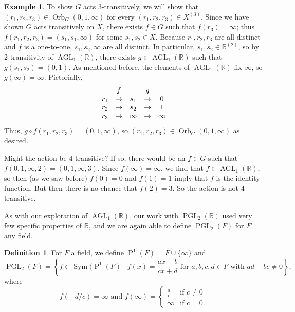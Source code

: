 \documentclass[11pt]{amsart}
\theoremstyle{plain}
\theoremstyle{definition}
\newtheorem*{definition*}{Definition}
\newtheorem{example}{Example}
\theoremstyle{remark}
\DeclareMathOperator{\Sym}{Sym}
\DeclareMathOperator{\AGL}{AGL}
\DeclareMathOperator{\PGL}{PGL}
\DeclareMathOperator{\Proj}{P}
\DeclareMathOperator{\Orb}{Orb}
\begin{document}
\begin{example}
To show $G$ acts $3$-transitively, we will show that $(r_1,r_2,r_3)\in \Orb_G(0,1,\infty)$ for every $(r_1,r_2,r_3)\in X^{(3)}$. Since we have shown $G$ acts transitively on $X$, there exists $f\in G$ such that $f(r_3) = \infty$; thus $f(r_1,r_2,r_3) = (s_1,s_1,\infty)$ for some $s_1,s_2\in X$.  Because $r_1,r_2,r_3$ are all distinct and $f$ is a one-to-one, $s_1,s_2,\infty$ are all distinct. In particular, $s_1,s_2 \in \mathbb{R}^{(2)}$, so by $2$-transitivity of $\AGL_1(\mathbb{R})$, there exists $g\in \AGL_1(\mathbb{R})$ such that $g(s_1,s_2) = (0,1)$. As mentioned before, the elements of $\AGL_1(\mathbb{R})$ fix $\infty$, so $g(\infty) = \infty$. Pictorially,
\[\begin{array}{ccccc}
\footnotesize
    & f           &        & g           & \\
r_1 & \rightarrow & s_1   & \rightarrow & 0\\
r_2 & \rightarrow & s_2   & \rightarrow & 1\\
r_3 & \rightarrow & \infty & \rightarrow & \infty\\
\end{array}\]
Thus, $g\circ f(r_1,r_2,r_3) = (0,1,\infty)$, so $(r_1,r_2,r_3)\in \Orb_G(0,1,\infty)$ as desired.

Might the action be $4$-transitive? If so, there would be an $f\in G$ such that $f (0,1,\infty,2) = (0,1,\infty,3)$. Since $f(\infty) = \infty$, we find that $f\in \AGL_1(\mathbb{R})$, so then (as we saw before) $f(0) = 0$ and $f(1) = 1$ imply that $f$ is the identity function. But then there is no chance that $f(2) = 3$. So the action is not $4$-transitive.
\end{example}

As with our exploration of $\AGL_1(\mathbb{R})$, our work with $\PGL_2(\mathbb{R})$ used very few specific properties of $\mathbb{R}$, and we are again able to define $\PGL_2(F)$ for $F$ any field.

\begin{definition*}
For $F$ a field, we define $\Proj^1(F) = F \cup \{\infty\}$ and \[\PGL_2(F) = \left\{ f \in \Sym(\Proj^1(F) \mid \text{$f(x) = \frac{ax+b}{cx+d}$ for $a,b,c,d\in F$ with $ad-bc\neq 0$}\right\},\]
where
\[f(-d/c) = \infty \text{ and } f(\infty) = \begin{cases} \frac{a}{c} &  \text{if $c\neq 0$}\\ \infty &  \text{if $c= 0$}.\end{cases}\]
\end{definition*}
\end{document}
